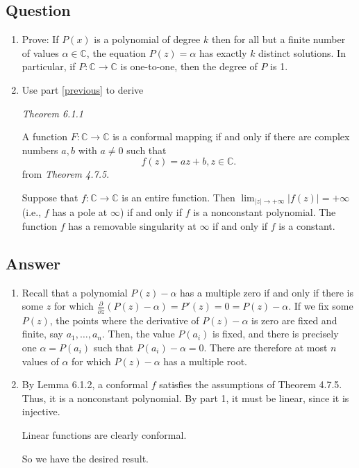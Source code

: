 \documentclass[11pt]{article}
\begin{document}
\subsection{Question}
\begin{enumerate}
\item \label{previous} Prove: If $P(x)$ is a polynomial of degree $k$ then for all but a finite number of values $\alpha \in \mathbb{C}$, the equation $P(z) = \alpha$ has exactly $k$ distinct solutions. In particular, if $P: \mathbb{C} \to \mathbb{C}$ is one-to-one, then the degree of $P$ is 1.
\item Use part \ref{previous} to derive

\emph{Theorem 6.1.1}

A function $F: \mathbb{C} \to \mathbb{C}$ is a conformal mapping if and only if there are complex numbers $a,b$ with $a \neq 0$ such that 
\[f(z) = az+ b, z \in \mathbb{C}.\]
 from \emph{Theorem 4.7.5}.
 
 Suppose that $f: \mathbb{C} \to \mathbb{C}$ is an entire function. Then $\lim_{|z| \to +\infty}|f(z)| = + \infty$ (i.e., $f$ has a pole at $\infty$) if and only if $f$ is a nonconstant polynomial. The function $f$ has a removable singularity at $\infty$ if and only if $f$ is a constant.
\end{enumerate}
\subsection{Answer}
\begin{enumerate}
\item Recall that a polynomial $P(z) - \alpha$ has a multiple zero if and only if  there is some $z$ for which $\frac{\partial}{\partial z} (P(z) -\alpha) = P'(z) = 0 = P(z) - \alpha$. If we fix some $P(z)$, the points where the derivative of $P(z) - \alpha$ is zero are fixed and finite, say $a_1, \dots, a_n$. Then, the value $P(a_i)$ is fixed, and there is precisely one $\alpha = P(a_i)$ such that $P(a_i) - \alpha=0$. There are therefore at most $n$ values of $\alpha$ for which $P(z) - \alpha$ has a multiple root.
\item By Lemma 6.1.2, a conformal $f$ satisfies the assumptions of Theorem 4.7.5. Thus, it is a nonconstant polynomial.  By part 1, it must be linear, since it is injective.

Linear functions are clearly conformal. 

So we have the desired result.
\end{enumerate}
\end{document}

